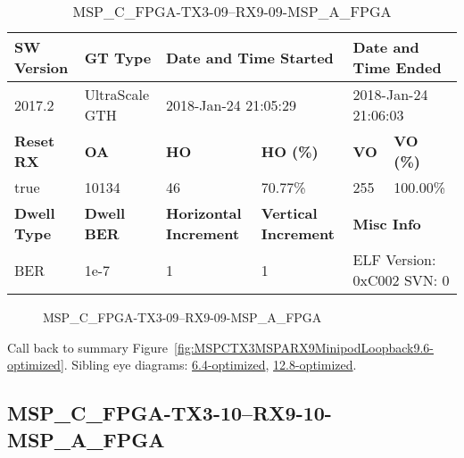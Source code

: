 \begin{table}[h]
\centering
\caption{MSP\_C\_FPGA-TX3-09--RX9-09-MSP\_A\_FPGA}
\label{tab:MSPCFPGATX309RX909MSPAFPGA9.6-optimized}
\begin{tabular}{@{}|l|l|l|l|l|l|@{}}
\toprule
\textbf{SW Version}                & \textbf{GT Type}   & \multicolumn{2}{l|}{\textbf{Date and Time Started}}            & \multicolumn{2}{l|}{\textbf{Date and Time Ended}}        \\ \midrule
2017.2                       & UltraScale GTH          & \multicolumn{2}{l|}{2018-Jan-24 21:05:29}                   & \multicolumn{2}{l|}{2018-Jan-24 21:06:03}               \\ \midrule
\textbf{Reset RX}                  & \textbf{OA} & \textbf{HO}   & \textbf{HO (\%)} & \textbf{VO} & \textbf{VO (\%)} \\ \midrule
true & 10134        & 46          & 70.77\%        & 255        & 100.00\%       \\ \midrule
\textbf{Dwell Type}                & \textbf{Dwell BER} & \textbf{Horizontal Increment} & \textbf{Vertical Increment}    & \multicolumn{2}{l|}{\textbf{Misc Info}}                  \\ \midrule
BER                            & 1e-7        & 1        & 1           & \multicolumn{2}{l|}{ELF Version: 0xC002 SVN: 0}                         \\ \bottomrule
\end{tabular}
\end{table}

\begin{figure}[h]
\caption{MSP\_C\_FPGA-TX3-09--RX9-09-MSP\_A\_FPGA} \label{fig:MSPCFPGATX309RX909MSPAFPGA9.6-optimized}
\end{figure}

Call back to summary Figure~\ref{fig:MSPCTX3MSPARX9MinipodLoopback9.6-optimized}.
Sibling eye diagrams: \hyperref[sec:MSPCFPGATX309RX909MSPAFPGA6.4-optimized]{6.4-optimized}, \hyperref[sec:MSPCFPGATX309RX909MSPAFPGA12.8-optimized]{12.8-optimized}.

\clearpage
\newpage


\subsection{MSP\_C\_FPGA-TX3-10--RX9-10-MSP\_A\_FPGA}\label{sec:MSPCFPGATX310RX910MSPAFPGA9.6-optimized}

